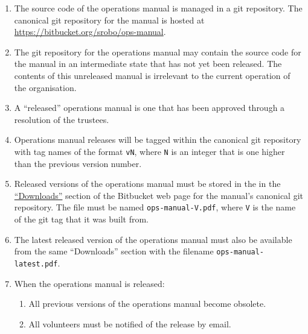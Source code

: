 \begin{enumerate}
\item The source code of the operations manual is managed in a git repository.  The canonical git repository for the manual is hosted at \url{https://bitbucket.org/srobo/ops-manual}.

\item The git repository for the operations manual may contain the source code for the manual in an intermediate state that has not yet been released.  The contents of this unreleased manual is irrelevant to the current operation of the organisation.

\item A ``released'' operations manual is one that has been approved through a resolution of the trustees.

\item Operations manual releases will be tagged within the canonical git repository with tag names of the format \texttt{vN}, where \texttt{N} is an integer that is one higher than the previous version number.

\item Released versions of the operations manual must be stored in the in the \href{https://bitbucket.org/srobo/ops-manual/downloads}{``Downloads''} section of the Bitbucket web page for the manual's canonical git repository.  The file must be named \texttt{ops-manual-V.pdf}, where \texttt{V} is the name of the git tag that it was built from.

\item The latest released version of the operations manual must also be available from the same ``Downloads'' section with the filename \texttt{ops-manual-latest.pdf}.

\item When the operations manual is released:
  \begin{enumerate}
  \item All previous versions of the operations manual become obsolete.
  \item All volunteers must be notified of the release by email.
  \end{enumerate}
\end{enumerate}

